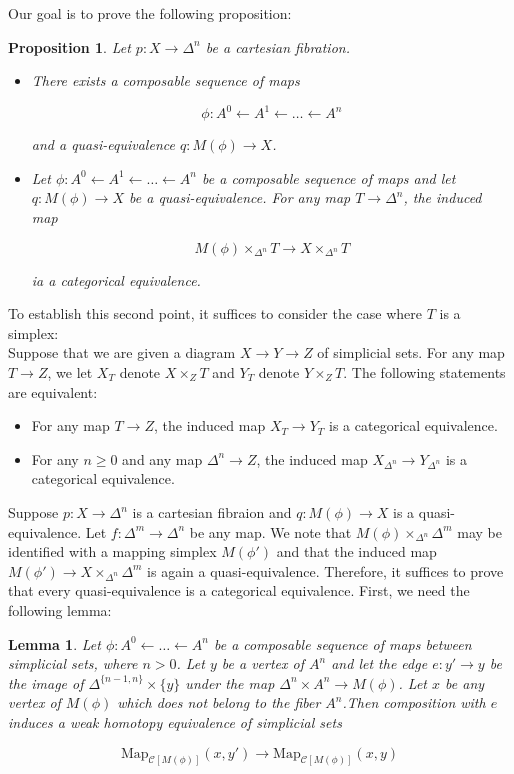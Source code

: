 \documentclass[12pt]{amsart}
\newcommand{\8}{\ensuremath{\infty}}
\newcommand{\Map}{\ensuremath{\text{Map}}}
\newtheorem{lemma}{Lemma}
\newtheorem{proposition}{Proposition}
\begin{document}
Our goal is to prove the following proposition:
\begin{proposition}
  Let $p:X\rightarrow \Delta^n$ be a cartesian fibration.
  \begin{itemize}
    \item There exists a composable sequence of maps

          $$
            \phi:A^0\leftarrow A^1\leftarrow \dots \leftarrow A^n
          $$

          and a quasi-equivalence $q:M(\phi)\rightarrow X$.
    \item Let $\phi:A^0\leftarrow A^1\leftarrow \dots\leftarrow A^n$ be a composable sequence of maps and let $q:M(\phi)\rightarrow X$ be a quasi-equivalence. For any map $T\rightarrow \Delta^n$, the induced map

          $$
            M(\phi)\times_{\Delta^n}T\rightarrow X\times_{\Delta^n}T
          $$

          ia a categorical equivalence.
  \end{itemize}
\end{proposition}

To establish this second point, it suffices to consider the case where $T$ is a simplex:\\
Suppose that we are given a diagram $X\rightarrow Y\rightarrow Z$ of simplicial sets. For any map $T\rightarrow Z$, we let $X_T$ denote $X\times_Z T$ and $Y_T$ denote $Y\times_Z T$. The following statements are equivalent:
\begin{itemize}
  \item For any map $T\rightarrow Z$, the induced map $X_T\rightarrow Y_T$ is a categorical equivalence.
  \item For any $n\geq 0$ and any map $\Delta^n\rightarrow Z$, the induced map $X_{\Delta^n}\rightarrow Y_{\Delta^n}$ is a categorical equivalence.
\end{itemize}

Suppose $p:X\rightarrow\Delta^n$ is a cartesian fibraion and $q:M(\phi)\rightarrow X$ is a quasi-equivalence. Let $f:\Delta^m\rightarrow \Delta^n$ be any map. We note that $M(\phi)\times_{\Delta^n}\Delta^m$ may be identified with a mapping simplex $M(\phi')$ and that the induced map $M(\phi')\rightarrow X\times_{\Delta^n}\Delta^m$ is again a quasi-equivalence. Therefore, it suffices to prove that every quasi-equivalence is a categorical equivalence. First, we need the following lemma:

\begin{lemma}
  Let $\phi:A^0\leftarrow\dots\leftarrow A^n$ be a composable sequence of maps between simplicial sets, where $n>0$. Let $y$ be a vertex of $A^n$ and let the edge $e:y'\rightarrow y$ be the image of $\Delta^{\{n-1,n\}}\times \{y\}$ under the map $\Delta^n\times A^n\rightarrow M(\phi)$. Let $x$ be any vertex of $M(\phi)$ which does not belong to the fiber $A^n$.Then composition with $e$ induces a weak homotopy equivalence of simplicial sets

  $$
    \Map_{\mathscr{C}[M(\phi)]}(x,y')\rightarrow \Map_{\mathscr{C}[M(\phi)]}(x,y)
  $$
\end{lemma}
\end{document}
